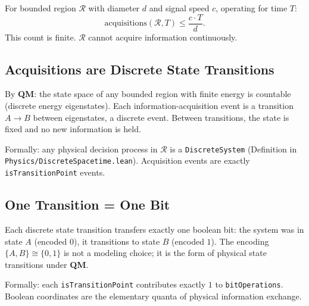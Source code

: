 \begin{theorem}\label{thm:bounded-acquisition}
For bounded region $\mathcal{R}$ with diameter $d$ and signal speed $c$,
operating for time $T$:
\[
\text{acquisitions}(\mathcal{R}, T) \leq \frac{c \cdot T}{d}.
\]
This count is finite. $\mathcal{R}$ cannot acquire information continuously.
\end{theorem}

\subsection{Acquisitions are Discrete State Transitions}\label{sec:discrete-transitions}

\begin{theorem}\label{thm:discrete-acquisition}
By \textbf{QM}: the state space of any bounded region with finite energy is
countable (discrete energy eigenstates). Each information-acquisition event is
a transition $A \to B$ between eigenstates, a discrete event. Between
transitions, the state is fixed and no new information is held.

Formally: any physical decision process in $\mathcal{R}$ is a
\texttt{DiscreteSystem} (Definition in \texttt{Physics/DiscreteSpacetime.lean}).
Acquisition events are exactly \texttt{isTransitionPoint} events.
\end{theorem}

\subsection{One Transition = One Bit}\label{sec:one-bit}

\begin{theorem}\label{thm:boolean-primitive}
Each discrete state transition transfers exactly one boolean bit:
the system was in state $A$ (encoded $0$), it transitions to state $B$ (encoded $1$).
The encoding $\{A, B\} \cong \{0, 1\}$ is not a modeling choice; it is the
form of physical state transitions under \textbf{QM}.

Formally: each \texttt{isTransitionPoint} contributes exactly $1$ to
\texttt{bitOperations}. Boolean coordinates are the elementary quanta of
physical information exchange.
\end{theorem}

